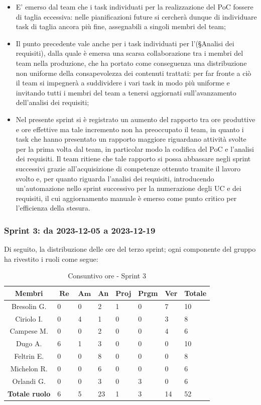 \documentclass[10pt, a4paper]{article}
\begin{document}
{{{{{{{{{{{{{{{{{\begin{itemize}
    \item E' emerso dal team che i task individuati per la realizzazione del PoC fossere di taglia eccessiva: nelle pianificazioni future si cercherà
    dunque di individuare task di taglia ancora più fine, assegnabili a singoli membri del team;
    \item Il punto precedente vale anche per i task individuati per l'(\S Analisi dei requisiti), dalla quale è emersa una scarsa collaborazione
    tra i membri del team nella produzione, che ha portato come conseguenza una distribuzione non uniforme della consapevolezza dei contenuti trattati: per 
    far fronte a ciò il team si impegnerà a suddividere i vari task in modo più uniforme e invitando tutti i membri del team a tenersi aggiornati 
    sull'avanzamento dell'analisi dei requisiti;
    \item Nel presente sprint si è registrato un aumento del rapporto tra ore produttive e ore effettive ma tale incremento non ha preoccupato il team, 
    in quanto i task che hanno presentato un rapporto maggiore riguardano attività svolte per la prima volta dal team, in particolar modo la codifica del PoC
    e l'analisi dei requisiti. Il team ritiene che tale rapporto si possa abbassare negli sprint successivi grazie all'acquisizione di competenze ottenuto tramite
    il lavoro svolto e, per quanto riguarda l'analisi dei requisiti, introducendo un'automazione nello sprint successivo per la numerazione degli UC e dei requisiti, 
    il cui aggiornamento manuale è emerso come punto critico per l'efficienza della stesura.
\end{itemize}
\subsubsection{Sprint 3: da 2023-12-05 a 2023-12-19}
Di seguito, la distribuzione delle ore del terzo sprint; ogni componente del gruppo ha rivestito i ruoli come segue:

\begin{table}[H]
    \begin{tabularx}{\textwidth}{c|X|X|X|X|X|X|X}
        \textbf{Membri} & $\operatorname{\textbf{Re}}$ & $\mathrm{\textbf{Am}}$ & \textbf{An} & \textbf{Proj} & \textbf{Prgm} & \textbf{Ver} & \textbf{Totale} \\
        \hline Bresolin G. & 0 & 0 & 2 & 1 & 0 & 7 & 10 \\
        \hline Ciriolo I.  & 0 & 4 & 1 & 0 & 0 & 3 & 8 \\
        \hline Campese M.  & 0 & 0 & 2 & 0 & 0 & 4 & 6 \\
        \hline Dugo A.     & 6 & 1 & 3 & 0 & 0 & 0 & 10 \\
        \hline Feltrin E.  & 0 & 0 & 8 & 0 & 0 & 0 & 8 \\
        \hline Michelon R. & 0 & 0 & 6 & 0 & 0 & 0 & 6 \\
        \hline Orlandi G.  & 0 & 0 & 3 & 0 & 3 & 0 & 6 \\
        \hline
        \textbf{Totale ruolo} & 6 & 5 & 23 & 1 & 3 & 14 & 52 
    \end{tabularx}
    \caption{Consuntivo ore - Sprint 3}
\end{table}

}}}}}}}}}}}}}}}}}
\end{document}
